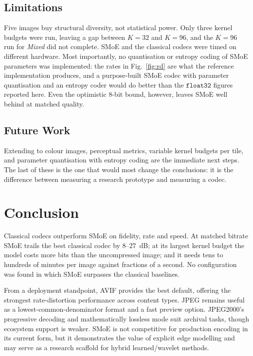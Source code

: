\documentclass[conference]{IEEEtran}
\begin{document}
\subsection{Limitations}
Five images buy structural diversity, not statistical power. Only three kernel budgets were run, leaving a gap between $K=32$ and $K=96$, and the $K=96$ run for \textit{Mixed} did not complete. SMoE and the classical codecs were timed on different hardware. Most importantly, no quantisation or entropy coding of SMoE parameters was implemented: the rates in Fig.~\ref{fig:rd} are what the reference implementation produces, and a purpose-built SMoE codec with parameter quantisation and an entropy coder would do better than the $\texttt{float32}$ figures reported here. Even the optimistic $8$-bit bound, however, leaves SMoE well behind at matched quality.

\subsection{Future Work}
Extending to colour images, perceptual metrics, variable kernel budgets per tile, and parameter quantisation with entropy coding are the immediate next steps. The last of these is the one that would most change the conclusions: it is the difference between measuring a research prototype and measuring a codec.

\section{Conclusion}
Classical codecs outperform SMoE on fidelity, rate and speed. At matched bitrate SMoE trails the best classical codec by $8$--$27$~dB; at its largest kernel budget the model costs more bits than the uncompressed image; and it needs tens to hundreds of minutes per image against fractions of a second. No configuration was found in which SMoE surpasses the classical baselines.

From a deployment standpoint, AVIF provides the best default, offering the strongest rate-distortion performance across content types. JPEG remains useful as a lowest-common-denominator format and a fast preview option. JPEG2000's progressive decoding and mathematically lossless mode suit archival tasks, though ecosystem support is weaker. SMoE is not competitive for production encoding in its current form, but it demonstrates the value of explicit edge modelling and may serve as a research scaffold for hybrid learned/wavelet methods.
\end{document}
